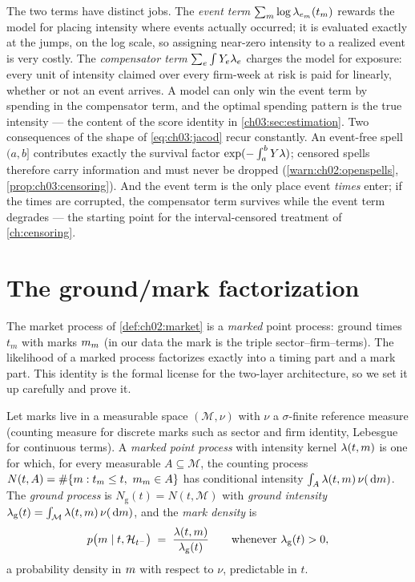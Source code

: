 The two terms have distinct jobs. The \emph{event term}
$\sum_m \log\lambda_{e_m}(t_m)$ rewards the model for placing intensity where
events actually occurred; it is evaluated exactly at the jumps, on the log
scale, so assigning near-zero intensity to a realized event is very
costly. The \emph{compensator term} $\sum_e\int Y_e\lambda_e$ charges
the model for exposure: every unit of intensity claimed over every
firm-week at risk is paid for linearly, whether or not an event arrives. A
model can only win the event term by spending in the compensator term, and
the optimal spending pattern is the true intensity --- the content of the
score identity in \cref{ch03:sec:estimation}. Two consequences of the
shape of \cref{eq:ch03:jacod} recur constantly. An event-free spell
$(a,b]$ contributes exactly the survival factor
$\exp(-\int_a^b Y\lambda)$; censored spells therefore carry information
and must never be dropped (\cref{warn:ch02:openspells},
\cref{prop:ch03:censoring}). And the event term is the only place event
\emph{times} enter; if the times are corrupted, the compensator term
survives while the event term degrades --- the starting point for the
interval-censored treatment of \cref{ch:censoring}.

\section{The ground/mark factorization}\label{ch03:sec:groundmark}

The market process of \cref{def:ch02:market} is a \emph{marked} point
process: ground times $t_m$ with marks $m_m$ (in our data the mark is
the triple sector--firm--terms). The likelihood of a marked process
factorizes exactly into a timing part and a mark part. This identity is
the formal license for the two-layer architecture, so we set it up
carefully and prove it.

\begin{definition}\label{def:ch03:markedintensity}
Let marks live in a measurable space $(\mathcal M, \nu)$ with $\nu$ a
$\sigma$-finite reference measure (counting measure for discrete marks such
as sector and firm identity, Lebesgue for continuous terms). A
\emph{marked point process} with intensity kernel $\lambda(t,m)$ is one
for which, for every measurable $A \subseteq \mathcal M$, the counting
process $N(t,A) = \#\{m : t_m \le t,\ m_m \in A\}$ has conditional
intensity $\int_A \lambda(t,m)\,\nu(\,\mathrm{d}m)$. The \emph{ground
process} is $N_{\mathrm g}(t) = N(t,\mathcal M)$ with \emph{ground
intensity} $\lambda_{\mathrm g}(t) = \int_{\mathcal M}
\lambda(t,m)\,\nu(\,\mathrm{d}m)$, and the \emph{mark density} is
\begin{equation}\label{eq:ch03:markdensity}
p\big(m \mid t, \mathcal{H}_{t^-}\big)
 \;=\; \frac{\lambda(t,m)}{\lambda_{\mathrm g}(t)}
 \qquad \text{whenever } \lambda_{\mathrm g}(t) > 0,
\end{equation}
a probability density in $m$ with respect to $\nu$, predictable in
$t$.
\end{definition}

